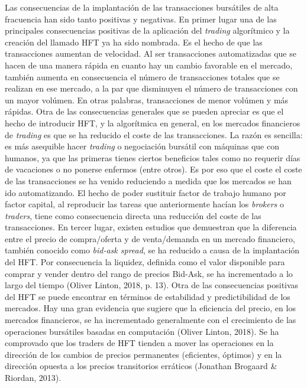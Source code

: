 \documentclass[]{DissertateUSU}
\begin{document}
\setlength\parskip{5ex}

\noindent Las consecuencias de la implantación de las transacciones
bursátiles de alta fracuencia han sido tanto positivas y negativas. En
primer lugar una de las principales consecuencias positivas de la
aplicación del \emph{trading} algorítmico y la creación del llamado HFT
ya ha sido nombrada. Es el hecho de que las transacciones aumentan de
velocidad. Al ser transacciones automatizadas que se hacen de una manera
rápida en cuanto hay un cambio favorable en el mercado, también aumenta
en consecuencia el número de transacciones totales que se realizan en
ese mercado, a la par que disminuyen el número de transacciones con un
mayor volúmen. En otras palabras, transacciones de menor volúmen y más
rápidas. Otra de las consecuencias generales que se pueden apreciar es
que el hecho de introducir HFT, y la algorítmica en general, en los
mercados financieros de \emph{trading} es que se ha reducido el coste de
las transacciones. La razón es sencilla: es más asequible hacer
\emph{trading} o negociación bursátil con máquinas que con humanos, ya
que las primeras tienes ciertos beneficios tales como no requerir días
de vacaciones o no ponerse enfermos (entre otros). Es por eso que el
coste el coste de las transacciones se ha venido reduciendo a medida que
los mercados se han ido automatizando. El hecho de poder sustituir
factor de trabajo humano por factor capital, al reproducir las tareas
que anteriormente hacían los \emph{brokers} o \emph{traders}, tiene como
consecuencia directa una reducción del coste de las transacciones. En
tercer lugar, existen estudios que demuestran que la diferencia entre el
precio de compra/oferta y de venta/demanda en un mercado financiero,
también conocido como \emph{bid-ask spread}, se ha reducido a causa de
la implantación del HFT. Por consecuencia la liquidez, definida como el
valor disponible para comprar y vender dentro del rango de precios
Bid-Ask, se ha incrementado a lo largo del tiempo (Oliver Linton, 2018,
p. 13). Otra de las consecuencias positivas del HFT se puede encontrar
en términos de estabilidad y predictibilidad de los mercados. Hay una
gran evidencia que sugiere que la eficiencia del precio, en los mercados
financieros, se ha incrementado generalmente con el crecimiento de las
operaciones bursátiles basadas en computación (Oliver Linton, 2018). Se
ha comprovado que los traders de HFT tienden a mover las operaciones en
la dirección de los cambios de precios permanentes (eficientes, óptimos)
y en la dirección opuesta a los precios transitorios erráticos (Jonathan
Brogaard \& Riordan, 2013).
\end{document}
